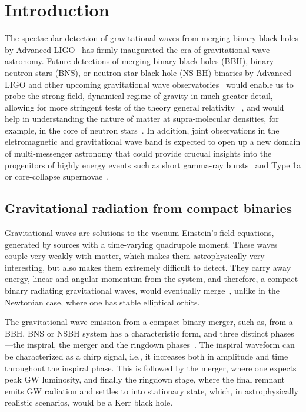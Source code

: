\chapter{Introduction}

The spectacular detection of gravitational waves from merging binary black
holes by Advanced LIGO~\cite{Event_0, Event_2} has firmly inaugurated the era
of gravitational wave astronomy. Future detections of merging binary black
holes (BBH), binary neutron stars (BNS), or neutron star-black hole (NS-BH)
binaries by Advanced LIGO and other upcoming  gravitational wave
observatories~\cite{KAGRA, Virgo, LIGO_india} would enable us to probe the
strong-field, dynamical regime of gravity in much greater detail, allowing for
more stringent tests of the theory general relativity ~\cite{Berti2015}, and
would help in understanding the nature of matter at supra-molecular densities,
for example, in the core of neutron stars~\cite{Agathos,Chatziioannou}. In
addition, joint observations in the eletromagnetic and gravitational wave band
is expected to open up a new domain of multi-messenger astronomy that could
provide crucual insights into the progenitors of highly energy events such as
short gamma-ray bursts~\cite{Arun2014} and Type 1a or core-collapse
supernovae~\cite{Falta2011,Ott2013}.

\section{Gravitational radiation from compact binaries}

Gravitational waves are solutions to the vacuum Einstein's field equations,
generated by sources with a time-varying quadrupole moment. These waves couple
very weakly with matter, which makes them astrophysically very interesting,
but also makes them extremely difficult to detect. They carry away energy,
linear and angular momentum from the system, and therefore, a compact binary
radiating gravitational waves, would eventually merge~\cite{Peters1963},
unlike in the Newtonian case, where one has stable elliptical orbits.

The gravitational wave emission from a compact binary merger, such as, from a
BBH, BNS or NSBH system has a characteristic form, and three distinct phases
---the inspiral, the merger and the ringdown phases~\cite{Event_0}. The
inspiral waveform can be characterized as a chirp signal, i.e., it increases
both in amplitude and time throughout the inspiral phase. This is followed by
the merger, where one expects peak GW luminosity, and finally the ringdown
stage, where the final remnant emits GW radiation and settles to into
stationary state, which, in astrophysically realistic scenarios, would be a
Kerr black hole.

